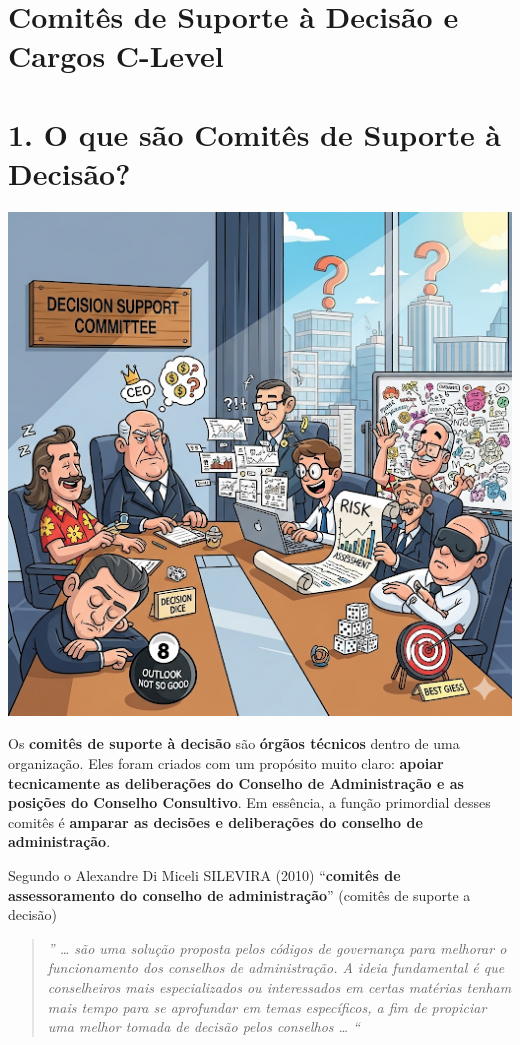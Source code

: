 \documentclass[
]{book}
\begin{document}
\section{Comitês de Suporte à Decisão e Cargos C-Level}\label{comituxeas-de-suporte-uxe0-decisuxe3o-e-cargos-c-level}

\section{1. O que são Comitês de Suporte à Decisão?}\label{o-que-suxe3o-comituxeas-de-suporte-uxe0-decisuxe3o}

\includegraphics{images/clipboard-2318693403.png}

Os \textbf{comitês de suporte à decisão} são \textbf{órgãos técnicos} dentro de uma organização. Eles foram criados com um propósito muito claro: \textbf{apoiar tecnicamente as deliberações do Conselho de Administração e as posições do Conselho Consultivo}. Em essência, a função primordial desses comitês é \textbf{amparar as decisões e deliberações do conselho de administração}.

Segundo o Alexandre Di Miceli SILEVIRA (2010) ``\textbf{comitês de assessoramento do conselho de administração}'' (comitês de suporte a decisão)

\begin{quote}
\emph{'' \ldots{} são uma solução proposta pelos códigos de governança para melhorar o funcionamento dos conselhos de administração. A ideia fundamental é que conselheiros mais especializados ou interessados em certas matérias tenham mais tempo para se aprofundar em temas específicos, a fim de propiciar uma melhor tomada de decisão pelos conselhos \ldots{} ``}
\end{quote}
\end{document}
